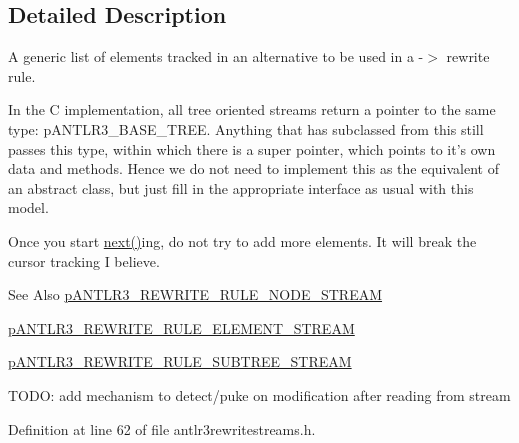 \subsection{Detailed Description}
A generic list of elements tracked in an alternative to be used in a -\/$>$ rewrite rule.

In the C implementation, all tree oriented streams return a pointer to the same type\-: p\-A\-N\-T\-L\-R3\-\_\-\-B\-A\-S\-E\-\_\-\-T\-R\-E\-E. Anything that has subclassed from this still passes this type, within which there is a super pointer, which points to it's own data and methods. Hence we do not need to implement this as the equivalent of an abstract class, but just fill in the appropriate interface as usual with this model.

Once you start \hyperlink{struct_a_n_t_l_r3___r_e_w_r_i_t_e___r_u_l_e___e_l_e_m_e_n_t___s_t_r_e_a_m__struct_a49a3d89cea69ba728843b12a5cfd51e3}{next()}ing, do not try to add more elements. It will break the cursor tracking I believe.

\begin{DoxySeeAlso}{See Also}
\hyperlink{antlr3interfaces_8h_ac687acdf803706344cfbd3f579474274}{p\-A\-N\-T\-L\-R3\-\_\-\-R\-E\-W\-R\-I\-T\-E\-\_\-\-R\-U\-L\-E\-\_\-\-N\-O\-D\-E\-\_\-\-S\-T\-R\-E\-A\-M} 

\hyperlink{antlr3interfaces_8h_ae7733833bf686184837d5eb2cdb5a53a}{p\-A\-N\-T\-L\-R3\-\_\-\-R\-E\-W\-R\-I\-T\-E\-\_\-\-R\-U\-L\-E\-\_\-\-E\-L\-E\-M\-E\-N\-T\-\_\-\-S\-T\-R\-E\-A\-M} 

\hyperlink{antlr3interfaces_8h_a5f81a145b3cf4347ec31698e7a14ca49}{p\-A\-N\-T\-L\-R3\-\_\-\-R\-E\-W\-R\-I\-T\-E\-\_\-\-R\-U\-L\-E\-\_\-\-S\-U\-B\-T\-R\-E\-E\-\_\-\-S\-T\-R\-E\-A\-M}
\end{DoxySeeAlso}
T\-O\-D\-O\-: add mechanism to detect/puke on modification after reading from stream 

Definition at line 62 of file antlr3rewritestreams.\-h.



